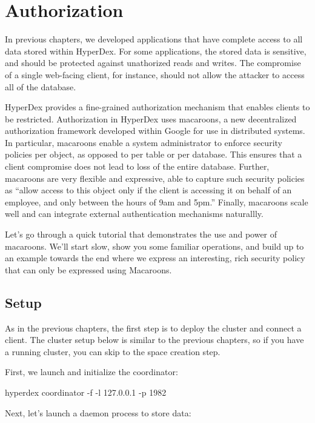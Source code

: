 \chapter{Authorization}
\label{chap:auth}

In previous chapters, we developed applications that have complete
access to all data stored within HyperDex.  For some applications, the stored
data is sensitive, and should be protected against unathorized reads and writes.
The compromise of a single web-facing client, for instance, should not allow the 
attacker to access all of the database.

HyperDex provides a fine-grained authorization mechanism that enables clients to
be restricted.  Authorization in HyperDex uses macaroons, a new
decentralized authorization framework developed within Google for use in
distributed systems. In particular, macaroons enable a system administrator
to enforce security policies per object, as opposed to per table or per database.
This ensures that a client compromise does not lead to loss of the entire database.
Further, macaroons are very flexible and expressive, able to capture such security
policies as ``allow access to this object only if the client is accessing it on
behalf of an employee, and only between the hours of 9am and 5pm.'' Finally,
macaroons scale well and can integrate external authentication mechanisms naturallly.

Let's go through a quick tutorial that demonstrates the use and power of macaroons. 
We'll start slow, show you some familiar operations, and build up to an example
towards the end where we express an interesting, rich security policy that can 
only be expressed using Macaroons. 

\section{Setup}
\label{sec:documents:setup}

As in the previous chapters, the first step is to deploy the cluster and connect
a client.  The cluster setup below is similar to the previous chapters, so if you
have a running cluster, you can skip to the space creation step.

First, we launch and initialize the coordinator:

\begin{consolecode}
hyperdex coordinator -f -l 127.0.0.1 -p 1982
\end{consolecode}

Next, let's launch a daemon process to store data:

